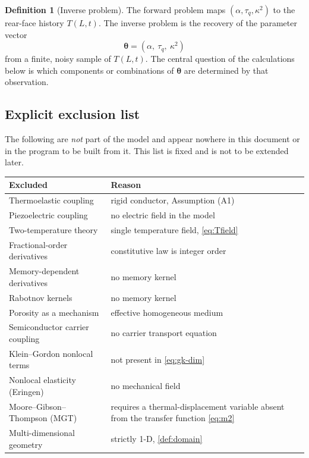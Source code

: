 \documentclass[11pt,a4paper]{article}
\theoremstyle{definition}
\newtheorem{definitionx}{Definition}[section]
\newcommand{\tq}{\tau_{q}}
\newcommand{\kk}{\kappa^{2}}
\begin{document}
\begin{definitionx}[Inverse problem]
\label{def:inverse}
The forward problem maps $(\alpha,\tq,\kk)$ to the rear-face history
$T(L,t)$. The inverse problem is the recovery of the parameter vector
\begin{equation}
  \bm{\theta}=(\alpha,\ \tq,\ \kk)
  \label{eq:theta-def}
\end{equation}
from a finite, noisy sample of $T(L,t)$. The central question of the
calculations below is which components or combinations of $\bm{\theta}$ are
determined by that observation.
\end{definitionx}

\subsection{Explicit exclusion list}
\label{sec:exclusions}

The following are \emph{not} part of the model and appear nowhere in this
document or in the program to be built from it. This list is fixed and is not
to be extended later.

\begin{center}
\begin{tabular}{@{}lp{8.6cm}@{}}
\toprule
\textbf{Excluded} & \textbf{Reason} \\
\midrule
Thermoelastic coupling & rigid conductor, Assumption (A1) \\
Piezoelectric coupling & no electric field in the model \\
Two-temperature theory & single temperature field, \eqref{eq:Tfield} \\
Fractional-order derivatives & constitutive law is integer order \\
Memory-dependent derivatives & no memory kernel \\
Rabotnov kernels & no memory kernel \\
Porosity as a mechanism & effective homogeneous medium \\
Semiconductor carrier coupling & no carrier transport equation \\
Klein--Gordon nonlocal terms & not present in \eqref{eq:gk-dim} \\
Nonlocal elasticity (Eringen) & no mechanical field \\
Moore--Gibson--Thompson (MGT) & requires a thermal-displacement variable
  absent from the transfer function \eqref{eq:m2} \\
Multi-dimensional geometry & strictly 1-D, \cref{def:domain} \\
\bottomrule
\end{tabular}
\end{center}
\end{document}
